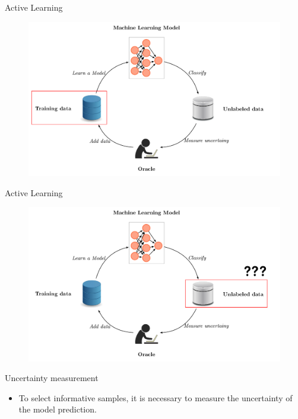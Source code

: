 \documentclass[10pt]{beamer}
\begin{document}
\begin{frame}[fragile]{Active Learning}
    \begin{figure}[htp]
        \centering
        \includegraphics[scale=0.3]{images/active_learning_labeled.png}
    \end{figure}
\end{frame}

\begin{frame}[fragile]{Active Learning}
    \begin{figure}[htp]
        \centering
        \includegraphics[scale=0.3]{images/active_learning_uncertainty.png}
    \end{figure}
\end{frame}

\begin{frame}[fragile]{Uncertainty measurement}
\begin{itemize}
\item To select informative samples, it is necessary to measure the
    \alert{uncertainty} of the model prediction.
\end{itemize}
\end{frame}
\end{document}
